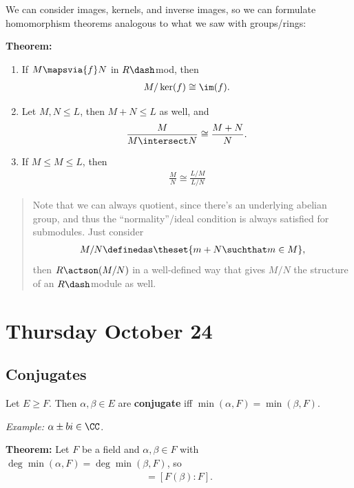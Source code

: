 We can consider images, kernels, and inverse images, so we can formulate
homomorphism theorems analogous to what we saw with groups/rings:

\textbf{Theorem:}

\begin{enumerate}
\def\labelenumi{\arabic{enumi}.}
\item
  If \(M \mapsvia{f} N\) in \(R\dash\)mod, then
  \begin{align*}
  M / \ker(f) \cong \im(f)
  .\end{align*}
\item
  Let \(M, N \leq L\), then \(M+N \leq L\) as well, and
  \begin{align*}
  \frac{M}{M\intersect N} \cong \frac{M+N}{N}
  .\end{align*}
\item
  If \(M\leq M\leq L\), then
  \begin{align*}
  \frac{M}{N} \cong \frac{L/M}{L/N}
  \end{align*}
\end{enumerate}

\begin{quote}
Note that we can always quotient, since there's an underlying abelian
group, and thus the ``normality''/ideal condition is always satisfied
for submodules. Just consider
\begin{align*}
M/N  \definedas \theset{m + N \suchthat m\in M}
,\end{align*} then \(R\actson (M/N)\) in a well-defined way that gives
\(M/N\) the structure of an \(R\dash\)module as well.
\end{quote}

\hypertarget{thursday-october-24}{%
\section{Thursday October 24}\label{thursday-october-24}}

\hypertarget{conjugates-1}{%
\subsection{Conjugates}\label{conjugates-1}}

Let \(E\geq F\). Then \(\alpha, \beta \in E\) are \textbf{conjugate} iff
\(\min(\alpha, F) = \min(\beta, F)\).

\emph{Example:} \(\alpha \pm bi \in \CC\).

\textbf{Theorem:} Let \(F\) be a field and \(\alpha, \beta \in F\) with
\(\deg \min (\alpha, F) = \deg \min (\beta, F)\), so \begin{align*}
[F(\alpha): F] = [F(\beta): F]
.\end{align*}

